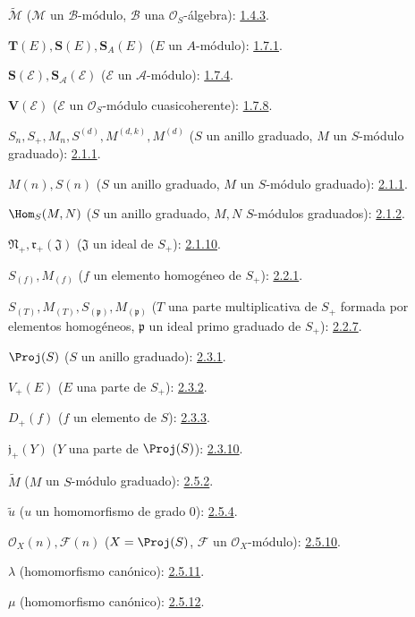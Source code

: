 \documentclass[oneside,10pt]{amsart}
\begin{document}
$\widetilde{\mathcal{M}}$ ($\mathcal{M}$ un $\mathcal{B}$-módulo,
$\mathcal{B}$ una $\mathcal{O}_S$-álgebra): \hyperref[II.1.4.3-fr]{1.4.3}.

$\mathbf{T}(E),\mathbf{S}(E),\mathbf{S}_A(E)$ ($E$ un $A$-módulo): \hyperref[II.1.7.1-fr]{1.7.1}.

$\mathbf{S}(\mathcal{E}),\mathbf{S}_{\mathcal{A}}(\mathcal{E})$
($\mathcal{E}$ un $\mathcal{A}$-módulo): \hyperref[II.1.7.4-fr]{1.7.4}.

$\mathbf{V}(\mathcal{E})$ ($\mathcal{E}$ un $\mathcal{O}_S$-módulo cuasicoherente): \hyperref[II.1.7.8-fr]{1.7.8}.

$S_n,S_+,M_n,S^{(d)},M^{(d,k)},M^{(d)}$
($S$ un anillo graduado, $M$ un $S$-módulo graduado): \hyperref[II.2.1.1-fr]{2.1.1}.

$M(n),S(n)$ ($S$ un anillo graduado, $M$ un $S$-módulo graduado): \hyperref[II.2.1.1-fr]{2.1.1}.

$\Hom_S(M,N)$ ($S$ un anillo graduado, $M,N$ $S$-módulos graduados): \hyperref[II.2.1.2-fr]{2.1.2}.

$\mathfrak N_+,\mathfrak r_+(\mathfrak J)$
($\mathfrak J$ un ideal de $S_+$): \hyperref[II.2.1.10-fr]{2.1.10}.

$S_{(f)},M_{(f)}$ ($f$ un elemento homogéneo de $S_+$): \hyperref[II.2.2.1-fr]{2.2.1}.

$S_{(T)},M_{(T)},S_{(\mathfrak p)},M_{(\mathfrak p)}$
($T$ una parte multiplicativa de $S_+$ formada por elementos homogéneos,
$\mathfrak p$ un ideal primo graduado de $S_+$): \hyperref[II.2.2.7-fr]{2.2.7}.

$\Proj(S)$ ($S$ un anillo graduado): \hyperref[II.2.3.1-fr]{2.3.1}.

$V_+(E)$ ($E$ una parte de $S_+$): \hyperref[II.2.3.2-fr]{2.3.2}.

$D_+(f)$ ($f$ un elemento de $S$): \hyperref[II.2.3.3-fr]{2.3.3}.

$\mathfrak j_+(Y)$ ($Y$ una parte de $\Proj(S)$): \hyperref[II.2.3.10-fr]{2.3.10}.

$\widetilde M$ ($M$ un $S$-módulo graduado): \hyperref[II.2.5.2-fr]{2.5.2}.

$\widetilde u$ ($u$ un homomorfismo de grado $0$): \hyperref[II.2.5.4-fr]{2.5.4}.

$\mathcal{O}_X(n),\mathcal{F}(n)$
($X=\Proj(S)$, $\mathcal{F}$ un $\mathcal{O}_X$-módulo): \hyperref[II.2.5.10-fr]{2.5.10}.

$\lambda$ (homomorfismo canónico): \hyperref[II.2.5.11-fr]{2.5.11}.

$\mu$ (homomorfismo canónico): \hyperref[II.2.5.12-fr]{2.5.12}.
\end{document}
